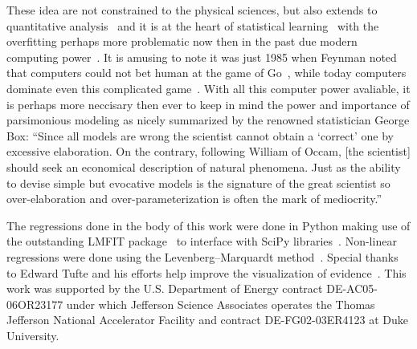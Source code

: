 \documentclass[10pt,aps,prc,twocolumn]{revtex4-1}
\begin{document}
These idea are not constrained to the physical sciences, but also extends 
to quantitative analysis~\cite{Brighton:2015} and it is at the heart of statistical 
learning~\cite{Hastie:2009} with the overfitting perhaps more problematic now then
in the past due modern computing power~\cite{Cawley:2010}.   It is amusing to note it
was just 1985 when Feynman noted that computers could not bet human at the
game of Go~\cite{Feynman:2008}, while today computers dominate even this complicated game~\cite{Silver:2016,Barradas:2018}.
With all this computer power avaliable, it is perhaps more neccisary then ever
to keep in mind the power and importance of parsimonious modeling as nicely 
summarized by the renowned statistician George Box: 
``Since all models are wrong the scientist cannot obtain a `correct' one
by excessive elaboration.  On the contrary, following William of Occam, 
[the scientist] should seek an economical description of natural phenomena. 
Just as the ability to devise simple but evocative models is the signature of the
great scientist so over-elaboration and over-parameterization is often
the mark of mediocrity.''~\cite{Box76}


\begin{acknowledgments}
The regressions done in the body of this work were done in Python making use of the
outstanding LMFIT package~\cite{Newville:2014} to interface with SciPy
libraries~\cite{Jones:2001}.  Non-linear regressions were done using the
Levenberg–Marquardt method~\cite{Levenberg:1944,Marquardt:1963}.  Special
thanks to Edward Tufte and his efforts help improve the visualization of 
evidence~\cite{Tufte:1986,Tufte:1990,Tufte:1997,Tufte:2006}.
This work was supported by the U.S.  Department of Energy contract DE-AC05-06OR23177
under which Jefferson Science Associates operates the Thomas Jefferson National 
Accelerator Facility and contract DE-FG02-03ER4123 at Duke University.
\end{acknowledgments}
\end{document}
